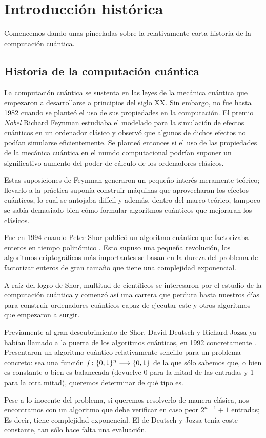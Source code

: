 \chapter{Introducción histórica}

Comencemos dando unas pinceladas sobre la relativamente corta historia de la computación cuántica.

\section{Historia de la computación cuántica}
La computación cuántica se sustenta en las leyes de la mecánica cuántica que empezaron a desarrollarse a principios del siglo XX. Sin embargo, no fue hasta 1982 cuando se planteó el uso de sus propiedades en la computación. El premio \textit{Nobel} Richard Feynman estudiaba el modelado para la simulación de efectos cuánticos en un ordenador clásico y observó que algunos de dichos efectos no podían simularse eficientemente. Se planteó entonces si el uso de las propiedades de la mecánica cuántica en el mundo computacional podrían suponer un significativo aumento del poder de cálculo de los ordenadores clásicos.\autocite{feynman1982modeling}

Estas suposiciones de Feynman generaron un pequeño interés meramente teórico; llevarlo a la práctica suponía construir máquinas que aprovecharan los efectos cuánticos, lo cual se antojaba difícil y además, dentro del marco teórico, tampoco se sabía demasiado bien cómo formular algoritmos cuánticos que mejoraran los clásicos.

Fue en 1994 cuando Peter Shor publicó un algoritmo cuántico que factorizaba enteros en tiempo polinómico \autocite{shor1994algorithms}. Esto supuso una pequeña revolución, los algoritmos criptográficos más importantes se basan en la dureza del problema de factorizar enteros de gran tamaño que tiene una complejidad exponencial.

A raíz del logro de Shor, multitud de científicos se interesaron por el estudio de la computación cuántica y comenzó así una carrera que perdura hasta nuestros días para construir ordenadores cuánticos capaz de ejecutar este y otros algoritmos que empezaron a surgir.

Previamente al gran descubrimiento de Shor, David Deutsch y Richard Jozsa ya habían llamado a la puerta de los algoritmos cuánticos, en 1992 concretamente \autocite{deutsch1992rapid}. Presentaron un algoritmo cuántico relativamente sencillo para un problema concreto: sea una función $f\colon \{0,1\}^n\longrightarrow \{0,1\}$ de la que sólo sabemos que, o bien es constante o bien es balanceada (devuelve 0 para la mitad de las entradas y 1 para la otra mitad), queremos determinar de qué tipo es.

Pese a lo inocente del problema, si queremos resolverlo de manera clásica, nos encontramos con un algoritmo que debe verificar en caso peor $2^{n-1}+1$ entradas; Es decir, tiene complejidad exponencial. El de Deutsch y Jozsa tenía coste constante, tan sólo hace falta una evaluación. 